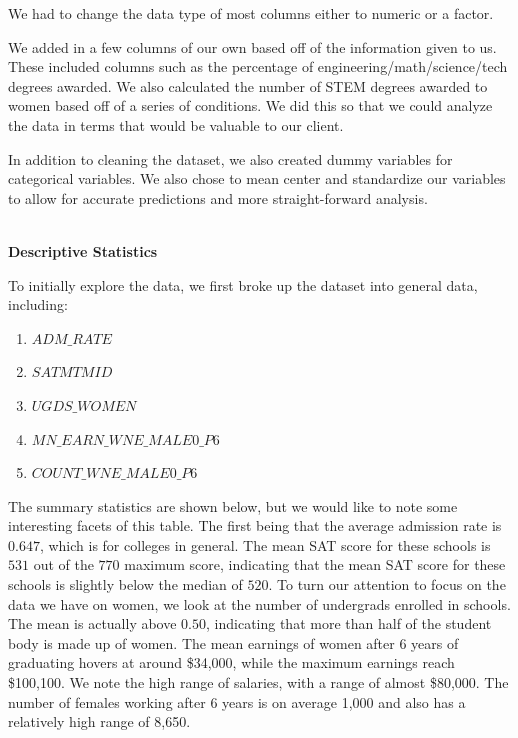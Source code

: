 \documentclass[11pt,english]{article}
\begin{document}
We had to change the data type of most columns either to numeric or a factor.

We added in a few columns of our own based off of the information given to us. These included columns such as the percentage of engineering/math/science/tech degrees awarded. We also calculated the number of STEM degrees awarded to women based off of a series of conditions. We did this so that we could analyze the data in terms that would be valuable to our client.

In addition to cleaning the dataset, we also created dummy variables for categorical variables. We also chose to mean center and standardize our variables to allow for accurate predictions and more straight-forward analysis. \\\

\textbf{Descriptive Statistics}

To initially explore the data, we first broke up the dataset into general data, including:

\begin{enumerate}

\item $ADM\_RATE$
\item $SATMTMID$
\item $UGDS\_WOMEN$
\item $MN\_EARN\_WNE\_MALE0\_P6$
\item $COUNT\_WNE\_MALE0\_P6$

\end{enumerate}

The summary statistics are shown below, but we would like to note some interesting facets of this table. The first being that the average admission rate is $0.647$, which is for colleges in general. The mean SAT score for these schools is $531$ out of the $770$ maximum score, indicating that the mean SAT score for these schools is slightly below the median of $520$. To turn our attention to focus on the data we have on women, we look at the number of undergrads enrolled in schools. The mean is actually above $0.50$, indicating that more than half of the student body is made up of women. The mean earnings of women after 6 years of graduating hovers at around \$34,000, while the maximum earnings reach \$100,100. We note the high range of salaries, with a range of almost \$80,000. The number of females working after 6 years is on average 1,000 and also has a relatively high range of 8,650. 
\end{document}
